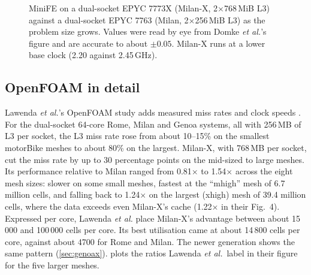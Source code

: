 \begin{figure}[htbp]
\centering
{}
\caption[MiniFE speed-up of Milan-X over Milan as the problem size grows]{MiniFE on a dual-socket EPYC 7773X (Milan-X, 2$\times$768\,MiB L3) against a dual-socket EPYC 7763 (Milan, 2$\times$256\,MiB L3) as the problem size grows. Values were read by eye from Domke \emph{et al.}'s figure \cite[Fig.~1]{domkeLocusPerformanceQuantifying2023} and are accurate to about $\pm 0.05$. Milan-X runs at a lower base clock (2.20 against 2.45\,GHz).}
\label{fig:minife-sweep}
\end{figure}

\subsection{OpenFOAM in detail}
\label{sec:openfoam}
Lawenda \emph{et al.}'s OpenFOAM study adds measured miss rates and clock speeds \cite{lawendaEvaluatingImpactL32025}. For the dual-socket 64-core Rome, Milan and Genoa systems, all with 256\,MB of L3 per socket, the L3 miss rate rose from about 10--15\% on the smallest motorBike meshes to about 80\% on the largest. Milan-X, with 768\,MB per socket, cut the miss rate by up to 30 percentage points on the mid-sized to large meshes. Its performance relative to Milan ranged from 0.81$\times$ to 1.54$\times$ across the eight mesh sizes: slower on some small meshes, fastest at the ``mhigh'' mesh of 6.7 million cells, and falling back to 1.24$\times$ on the largest (xhigh) mesh of 39.4 million cells, where the data exceeds even Milan-X's cache (1.22$\times$ in their Fig.~4). Expressed per core, Lawenda \emph{et al.} place Milan-X's advantage between about 15\,000 and 100\,000 cells per core. Its best utilisation came at about 14\,800 cells per core, against about 4700 for Rome and Milan. The newer generation shows the same pattern (\cref{sec:genoax}).  plots the ratios Lawenda \emph{et al.}\ label in their figure for the five larger meshes.

